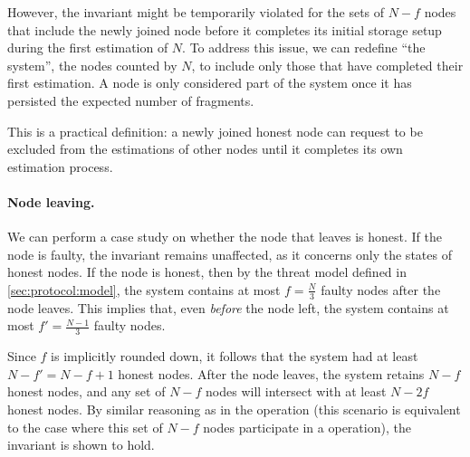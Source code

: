 However, the invariant might be temporarily violated for the sets of $N - f$ nodes that include the newly joined node before it completes its initial storage setup during the first estimation of $N$.
To address this issue, we can redefine ``the system'', \ie the nodes counted by $N$, to include only those that have completed their first estimation.
A node is only considered part of the system once it has persisted the expected number of fragments.

This is a practical definition: a newly joined honest node can request to be excluded from the estimations of other nodes until it completes its own estimation process.

\paragraph{Node leaving.}
We can perform a case study on whether the node that leaves is honest.
If the node is faulty, the invariant remains unaffected, as it concerns only the states of honest nodes.
If the node is honest, then by the threat model defined in \autoref{sec:protocol:model}, the system contains at most $f = \frac{N}{3}$ faulty nodes after the node leaves.
This implies that, even \emph{before} the node left, the system contains at most $f' = \frac{N - 1}{3}$ faulty nodes.

Since $f$ is implicitly rounded down, it follows that the system had at least $N - f' = N - f + 1$ honest nodes.
After the node leaves, the system retains $N - f$ honest nodes, and any set of $N - f$ nodes will intersect with at least $N - 2f$ honest nodes.
By similar reasoning as in the  operation (\ie this scenario is equivalent to the case where this set of $N - f$ nodes participate in a  operation), the invariant is shown to hold.